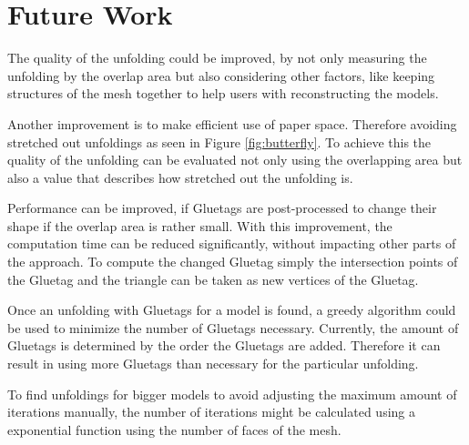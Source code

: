 \documentclass[draft,final]{vutinfth} %
\begin{document}
\section{Future Work}
The quality of the unfolding could be improved, by not only measuring the unfolding by the overlap area but also considering other factors, like keeping structures of the mesh together to help users with reconstructing the models.

Another improvement is to make efficient use of paper space. Therefore avoiding stretched out unfoldings as seen in Figure \ref{fig:butterfly}. To achieve this the quality of the unfolding can be evaluated not only using the overlapping area but also a value that describes how stretched out the unfolding is.

Performance can be improved, if Gluetags are post-processed to change their shape if the overlap area is rather small. With this improvement, the computation time can be reduced significantly, without impacting other parts of the approach. To compute the changed Gluetag simply the intersection points of the Gluetag and the triangle can be taken as new vertices of the Gluetag.

Once an unfolding with Gluetags for a model is found, a greedy algorithm could be used to minimize the number of Gluetags necessary. Currently, the amount of Gluetags is determined by the order the Gluetags are added. Therefore it can result in using more Gluetags than necessary for the particular unfolding.

To find unfoldings for bigger models to avoid adjusting the maximum amount of iterations manually, the number of iterations might be calculated using a exponential function using the number of faces of the mesh.
\backmatter

\listoffigures %

\cleardoublepage %
\listoftables %

\listofalgorithms
{}

\printindex

\printglossaries



\end{document}
